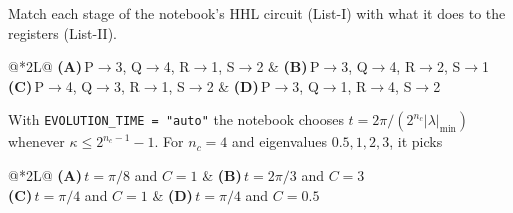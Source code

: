 \documentclass[11pt,a4paper]{article}
\newcommand{\optlabel}[1]{\textbf{(#1)}}
\newenvironment{qitem}[1]{\begin{list}{}{\setlength{\leftmargin}{3.3em}\setlength{\labelwidth}{3.1em}%
  \setlength{\labelsep}{0.2em}\setlength{\topsep}{3pt}\setlength{\parsep}{3pt}}\item[\textbf{Q.#1}\hfill]}{\end{list}}
\newcommand{\qsep}{\par\vspace{2pt}{\color{black!15}\hrule}\vspace{4pt}}
\begin{document}
\begin{qitem}{46}
Match each stage of the notebook's HHL circuit (List-I) with what it does to the registers (List-II).
\par\smallskip{}
\par\smallskip\noindent\begin{tabularx}{\linewidth}{@{}*{2}{L}@{}}
\optlabel{A}\,P$\to$3, Q$\to$4, R$\to$1, S$\to$2 & \optlabel{B}\,P$\to$3, Q$\to$4, R$\to$2, S$\to$1 \\[3pt]
\optlabel{C}\,P$\to$4, Q$\to$3, R$\to$1, S$\to$2 & \optlabel{D}\,P$\to$3, Q$\to$1, R$\to$4, S$\to$2
\end{tabularx}
\end{qitem}
\qsep

\begin{qitem}{47}
With \texttt{EVOLUTION\_TIME = "auto"} the notebook chooses $t = 2\pi/(2^{n_c}|\lambda|_{\min})$ whenever $\kappa \le 2^{n_c - 1} - 1$. For $n_c = 4$ and eigenvalues $0.5, 1, 2, 3$, it picks
\par\smallskip\noindent\begin{tabularx}{\linewidth}{@{}*{2}{L}@{}}
\optlabel{A}\,$t = \pi/8$ and $C = 1$ & \optlabel{B}\,$t = 2\pi/3$ and $C = 3$ \\[3pt]
\optlabel{C}\,$t = \pi/4$ and $C = 1$ & \optlabel{D}\,$t = \pi/4$ and $C = 0.5$
\end{tabularx}
\end{qitem}
\qsep
\end{document}
